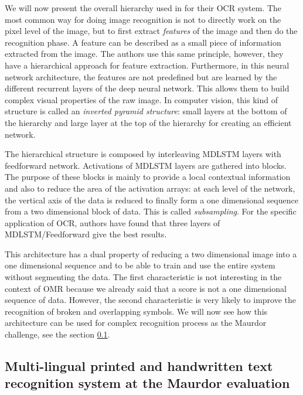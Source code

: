 \documentclass[11pt]{sdm}
\begin{document}
We will now present the overall hierarchy used in \cite{graves_offline_2009} for their OCR system.
The most common way for doing image recognition is not to directly work on the pixel level of the image, but to first extract \textit{features} of the image and then do the recognition phase.
A feature can be described as a small piece of information extracted from the image.
The authors use this same principle, however, they have a hierarchical approach for feature extraction.
Furthermore, in this neural network architecture, the features are not predefined but are learned by the different recurrent layers of the deep neural network.
This allows them to build complex visual properties of the raw image.
In computer vision, this kind of structure is called an \textit{inverted pyramid structure}: small layers at the bottom of the hierarchy and large layer at the top of the hierarchy for creating an efficient network.

The hierarchical structure is composed by interleaving MDLSTM layers with feedforward network.
Activations of MDLSTM layers are gathered into blocks.
The purpose of these blocks is mainly to provide a local contextual information and also to reduce the area of the activation arrays: at each level of the network, the vertical axis of the data is reduced to finally form a one dimensional sequence from a two dimensional block of data.
This is called \textit{subsampling}.
For the specific application of OCR, authors have found that three layers of MDLSTM/Feedforward give the best results.

This architecture has a dual property of reducing a two dimensional image into a one dimensional sequence and to be able to train and use the entire system without segmenting the data.
The first characteristic is not interesting in the context of OMR because we already said that a score is not a one dimensional sequence of data.
However, the second characteristic is very likely to improve the recognition of broken and overlapping symbols.
We will now see how this architecture can be used for complex recognition process as the Maurdor challenge, see the section \ref{ssec:maurdor}.

\subsection{Multi-lingual printed and handwritten text recognition system at the Maurdor evaluation} \label{ssec:maurdor}
\end{document}
